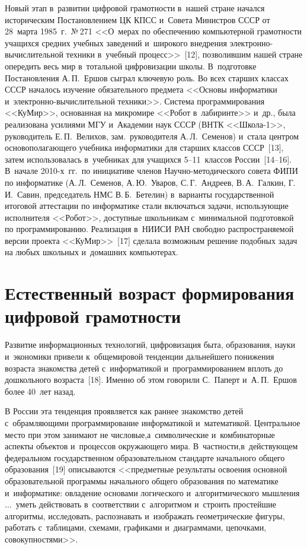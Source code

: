 \begin{multicols}{2}
  Новый этап в~развитии цифровой грамотности в~нашей стране начался 
историческим Постановлением ЦК КПСС и~Совета Министров СССР от 
28~марта 1985~г.\ №\,271 <<О~мерах по обеспечению компьютерной 
грамотности учащихся средних учебных заведений и~широкого внедрения 
элект\-рон\-но-вы\-чис\-ли\-тель\-ной техники в~учебный процесс>>~[12],  
позволившим нашей стране опередить весь мир в~тотальной цифровизации 
школы. В~подготовке Постановления А.\,П.~Ершов сыграл ключевую роль. 
Во всех старших классах СССР началось изучение обязательного предмета 
<<Основы информатики и~элект\-рон\-но-вы\-чис\-ли\-тель\-ной техники>>. 
Система программирования <<КуМир>>, основанная на микромире <<Робот в~лабиринте>> 
и~др., была реализована усилиями МГУ и~Академии наук \mbox{СССР} 
(ВНТК <<Школа-1>>, руководитель Е.\,П.~Велихов, зам.\ руководителя 
А.\,Л.~Семенов) и~стала цент\-ром основополагающего учебника информатики 
для старших классов СССР~[13], затем использовалась в~учебниках для 
учащихся 5--11~классов России~[14--16]. В~начале 2010-х~гг.\ по инициативе 
членов На\-уч\-но-ме\-то\-ди\-че\-ско\-го совета ФИПИ по информатике 
(А.\,Л.~Семенов, А.\,Ю.~Уваров, С.\,Г.~Анд\-ре\-ев, В.\,А.~Галкин, Г.\,И.~Савин, 
председатель НМС В.\,Б.~Бетелин) в~варианты государственной итоговой аттестации по информатике стали 
включаться задачи, использующие исполнителя <<Робот>>, доступные 
школьникам с~минимальной подготовкой по программированию. Реализация в~НИИСИ РАН 
свободно распространяемой версии проекта <<\mbox{КуМир}>>~[17] 
сделала возможным решение подобных задач на любых школьных и~домашних компьютерах.
  
\section{Естественный возраст формирования цифровой 
грамотности}

  Развитие информационных технологий, цифровизация быта, образования, 
науки и~экономики привели к~общемировой тенденции дальнейшего 
понижения возраста знакомства детей с~информатикой и~программированием 
вплоть до дошкольного возраста~[18]. Именно об этом говорили С.~Паперт 
и~А.\,П.~Ершов более 40~лет назад.
  
  В России эта тенденция проявляется как раннее знакомство детей с~обрамляющими 
  программирование информатикой и~математикой. 
Цент\-раль\-ное место при этом занимают не числовые,\linebreak а~символические 
и~комбинаторные аспекты объектов и~процессов окружающего мира. 
В~част\-ности,\linebreak в~действующем федеральном государственном 
образовательном стандарте начального {общего} образования~[19] 
описываются <<предметные результаты освоения основной образовательной 
\mbox{программы} начального общего образования по математике и~информатике: 
овладение основами {логического} и~алгоритмического мышления$\ldots$\ 
уметь действовать в~соответствии с~алгоритмом и~строить простейшие 
алгоритмы, исследовать, распознавать и~изображать геометрические фигуры, 
работать с~таблицами, схемами, графиками и~диаграммами, цепочками, 
совокупностями>>.
  

\end{multicols}
